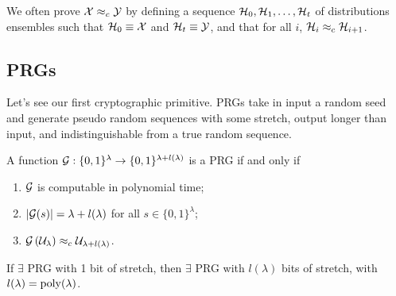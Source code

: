 We often prove $\mathcal{X} \approx_c \mathcal{Y}$ by defining a sequence $\mathcal{H}_0, \mathcal{H}_1, \dots, \mathcal{H}_t$ of distributions ensembles such that $\mathcal{H}_0 \equiv \mathcal{X}$ and $\mathcal{H}_t \equiv \mathcal{Y}$, and that for all $i$, $\mathcal{H}_i \approx_c \mathcal{H}_{i+1}$.

\subsection{\aclp{PRG}}

Let's see our first cryptographic primitive.
\acp{PRG} take in input a random seed and generate pseudo random sequences with some stretch, \ie output longer than input, and indistinguishable from a true random sequence.

\begin{definition}
	A function $\mathcal{G} : \{0,1\}^{\lambda} \to \{0,1\}^{\lambda + l(\lambda)}$ is a \ac{PRG} if and only if
	\begin{enumerate}
		\item $\mathcal{G}$ is computable in polynomial time;
		\item $\left|{\mathcal{G}(s)}\right| = \lambda + l(\lambda)$ for all $s \in \{0,1\}^{\lambda}$;
		\item $\mathcal{G} \left( \mathcal{U}_{\lambda} \right) \approx_c \mathcal{U}_{\lambda + l(\lambda)}$.
	\end{enumerate}
\end{definition}

\begin{theorem} \label{thm:prg-any-stretch}
	If $\exists$ \ac{PRG} with 1 bit of stretch, then $\exists$ \ac{PRG} with $l(\lambda)$ bits of stretch, with $l(\lambda) = \mathrm{poly}(\lambda)$.
\end{theorem}

